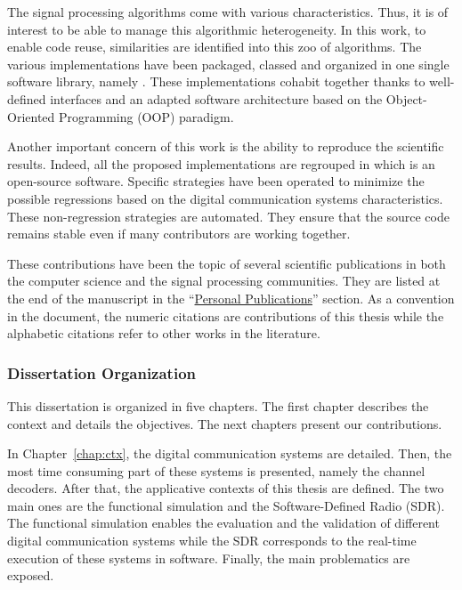 The signal processing algorithms come with various characteristics. Thus, it is
of interest to be able to manage this algorithmic heterogeneity. In this work,
to enable code reuse, similarities are identified into this zoo of algorithms.
The various implementations have been packaged, classed and organized in
one single software library, namely \AFFECT. These implementations cohabit
together thanks to well-defined interfaces and an adapted software architecture
based on the Object-Oriented Programming (OOP) paradigm.

Another important concern of this work is the ability to reproduce the
scientific results. Indeed, all the proposed implementations are regrouped in
\AFFECT which is an open-source software. Specific strategies have been operated
to minimize the possible regressions based on the digital communication systems
characteristics. These non-regression strategies are automated. They ensure that
the source code remains stable even if many contributors are working together.

These contributions have been the topic of several scientific publications in
both the computer science and the signal processing communities. They are listed
at the end of the manuscript in the
``\hyperref[chap:publi]{Personal Publications}'' section. As a convention in the
document, the numeric citations are contributions of this thesis while the
alphabetic citations refer to other works in the literature.

\subsubsection*{Dissertation Organization}

This dissertation is organized in five chapters. The first chapter describes the
context and details the objectives. The next chapters present our contributions.

In Chapter~\ref{chap:ctx}, the digital communication systems are detailed. Then,
the most time consuming part of these systems is presented, namely the channel
decoders. After that, the applicative contexts of this thesis are defined. The
two main ones are the functional simulation and the Software-Defined Radio
(SDR). The functional simulation enables the evaluation and the validation of
different digital communication systems while the SDR corresponds to the
real-time execution of these systems in software. Finally, the main problematics
are exposed.

